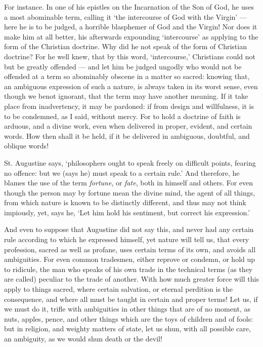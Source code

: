 For instance. In one of his epistles on the Incarnation of the Son of God, he uses a most abominable term, calling it ‘the intercourse of God with the Virgin’ — here he is to be judged, a horrible blasphemer of God and the Virgin! Nor does it make him at all better, his afterwards expounding ‘intercourse’ as applying to the form of the Christian doctrine. Why did he not speak of the form of Christian doctrine? For he well knew, that by this word, ‘intercourse,’ Christians could not but be greatly offended — and let him be judged ungodly who would not be offended at a term so abominably obscene in a matter so sacred: knowing that, an ambiguous expression of such a nature, is always taken in its worst sense, even though we benot ignorant, that the term may have another meaning. If it take place from inadvertency, it may be pardoned: if from design and willfulness, it is to be condemned, as I said, without mercy. For to hold a doctrine of faith is arduous, and a divine work, even when delivered in proper, evident, and certain words. How then shall it be held, if it be delivered in ambiguous, doubtful, and oblique words!

St. Augustine says, ‘philosophers ought to speak freely on difficult points, fearing no offence: but we (says he) must speak to a certain rule.’ And therefore, he blames the use of the term \emph{fortune}, or \emph{fate}, both in himself and others. For even though the person may by fortune mean the divine mind, the agent of all things, from which nature is known to be distinctly different, and thus may not think impiously, yet, says he, ‘Let him hold his sentiment, but correct his expression.’

And even to suppose that Augustine did not say this, and never had any certain rule according to which he expressed himself, yet nature will tell us, that every profession, sacred as well as profane, uses certain terms of its own, and avoids all ambiguities. For even common tradesmen, either reprove or condemn, or hold up to ridicule, the man who speaks of his own trade in the technical terms (as they are called) peculiar to the trade of another. With how much greater force will this apply to things sacred, where certain salvation, or eternal perdition is the consequence, and where all must be taught in certain and proper terms! Let us, if we must do it, trifle with ambiguities in other things that are of no moment, as nuts, apples, pence, and other things which are the toys of children and of fools: but in religion, and weighty matters of state, let us shun, with all possible care, an ambiguity, as we would shun death or the devil!

